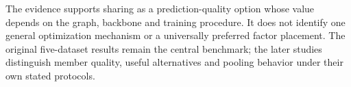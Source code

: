 The evidence supports sharing as a prediction-quality option whose value depends on the graph, backbone and training procedure. It does not identify one general optimization mechanism or a universally preferred factor placement. The original five-dataset results remain the central benchmark; the later studies distinguish member quality, useful alternatives and pooling behavior under their own stated protocols.

